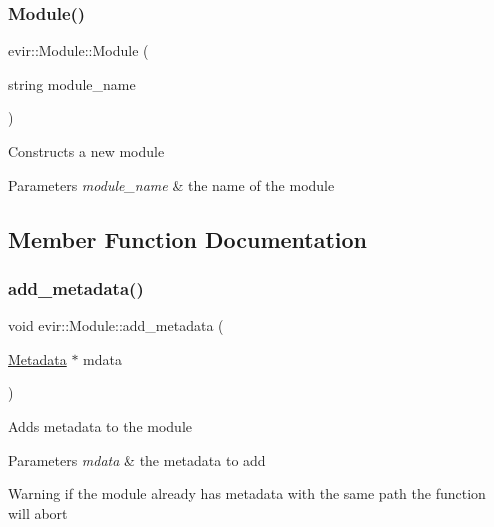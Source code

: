 \subsubsection{\texorpdfstring{Module()}{Module()}}
{\footnotesize\ttfamily evir\+::\+Module\+::\+Module (\begin{DoxyParamCaption}\item[{string}]{module\+\_\+name }\end{DoxyParamCaption})}

Constructs a new module 
\begin{DoxyParams}{Parameters}
{\em module\+\_\+name} & the name of the module \\
\hline
\end{DoxyParams}


\subsection{Member Function Documentation}
\mbox{\label{classevir_1_1Module_a8e8193a7ab86fb626058bd6135f8e2f8}} 
\subsubsection{\texorpdfstring{add\+\_\+metadata()}{add\_metadata()}}
{\footnotesize\ttfamily void evir\+::\+Module\+::add\+\_\+metadata (\begin{DoxyParamCaption}\item[{\hyperlink{classevir_1_1Metadata}{Metadata} $\ast$}]{mdata }\end{DoxyParamCaption})}

Adds metadata to the module 
\begin{DoxyParams}{Parameters}
{\em mdata} & the metadata to add \\
\hline
\end{DoxyParams}
\begin{DoxyWarning}{Warning}
if the module already has metadata with the same path the function will abort 
\end{DoxyWarning}
\mbox{\label{classevir_1_1Module_a4f0d16ffaa997fe034b89b476825ac51}} 

